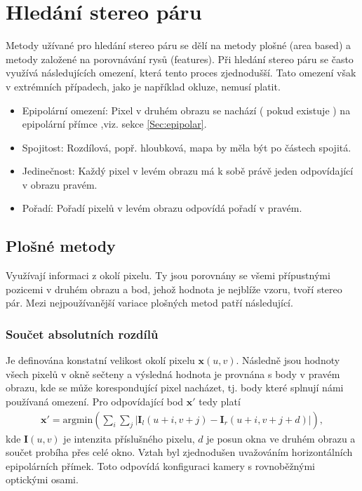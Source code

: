 \documentclass[twoside]{ctuthesis}
\newcommand{\tl}[1]{$\mathbf{#1}$}
\begin{document}
\section{Hledání stereo páru}
Metody užívané pro hledání stereo páru se dělí na metody plošné (area based) a metody založené na porovnávání rysů (features). Při hledání stereo páru se často využívá následujících omezení, která tento proces zjednodušší. Tato omezení však v extrémních případech, jako je například okluze,  nemusí platit.
\begin{itemize}
    \item Epipolární omezení: Pixel v druhém obrazu se nachází ( pokud existuje ) na epipolární přímce ,viz. sekce \ref{Sec:epipolar}.
    \item Spojitost: Rozdílová, popř. hloubková, mapa by měla být po částech spojitá.
    \item Jedinečnost: Každý pixel v levém obrazu má k sobě právě jeden odpovídající v obrazu pravém. 
    \item Pořadí: Pořadí pixelů v levém obrazu odpovídá pořadí v pravém.
\end{itemize}

\subsection{Plošné metody}
Využívají informaci z okolí pixelu. Ty jsou porovnány se všemi přípustnými pozicemi v druhém obrazu a bod, jehož hodnota je nejblíže vzoru, tvoří stereo pár. Mezi nejpoužívanější variace plošných metod patří následující.

\subsubsection{Součet absolutních rozdílů}
Je definována konstatní velikost okolí pixelu $\mathbf{x}(u,v)$. Následně jsou hodnoty všech pixelů v okně sečteny a výsledná hodnota je provnána s body v pravém obrazu, kde se může korespondující pixel nacházet, tj. body které splnují námi používaná omezení. Pro odpovídající bod \tl{x'} tedy platí
\begin{align}
    \mathbf{x'} = \text{argmin}\left( \displaystyle\sum_i \displaystyle\sum_j |\mathbf{I}_l(u+i,v+j) - \mathbf{I}_r(u+i, v+j + d)| \right),
\end{align}
kde $\mathbf{I}(u,v)$ je intenzita příslušného pixelu, $d$ je posun okna ve druhém obrazu a součet probíha přes celé okno. Vztah byl zjednodušen uvažováním horizontálních epipolárních přímek. Toto odpovídá konfiguraci kamery s rovnoběžnými optickými osami.
\end{document}
